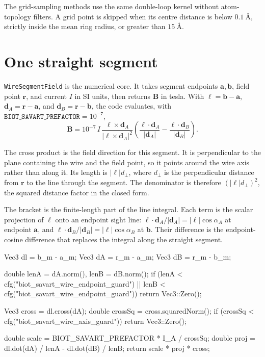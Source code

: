 \documentclass[11pt]{article}
\newcommand{\code}[1]{\texttt{#1}}
\begin{document}
The grid-sampling methods use the same double-loop kernel without atom-topology
filters. A grid point is skipped when its centre distance is below
\(\SI{0.1}{\angstrom}\), strictly inside the mean ring radius, or greater than
\(\SI{15}{\angstrom}\).

\section{One straight segment}

\code{WireSegmentField} is the numerical core. It takes segment endpoints
\(\bm a,\bm b\), field point \(\bm r\), and current \(I\) in SI units, then
returns \(\bm B\) in tesla. With
\(\bm\ell=\bm b-\bm a\), \(\bm d_A=\bm r-\bm a\), and
\(\bm d_B=\bm r-\bm b\), the code evaluates, with
\(\code{BIOT\_SAVART\_PREFACTOR}=10^{-7}\),
\[
  \bm B =
  10^{-7}\, I\,
  \frac{\bm\ell\times\bm d_A}{|\bm\ell\times\bm d_A|^2}
  \left(
    \frac{\bm\ell\cdot\bm d_A}{|\bm d_A|}
    -\frac{\bm\ell\cdot\bm d_B}{|\bm d_B|}
  \right).
\]

The cross product is the field direction for this segment. It is perpendicular
to the plane containing the wire and the field point, so it points around the
wire axis rather than along it. Its length is
\(|\bm\ell|d_\perp\), where \(d_\perp\) is the perpendicular distance from
\(\bm r\) to the line through the segment. The denominator is therefore
\((|\bm\ell|d_\perp)^2\), the squared distance factor in the closed form.

The bracket is the finite-length part of the line integral. Each term is the
scalar projection of \(\bm\ell\) onto an endpoint sight line:
\(\bm\ell\cdot\bm d_A/|\bm d_A|=|\bm\ell|\cos\alpha_A\) at endpoint
\(\bm a\), and \(\bm\ell\cdot\bm d_B/|\bm d_B|=|\bm\ell|\cos\alpha_B\) at
\(\bm b\). Their difference is the endpoint-cosine difference that replaces
the integral along the straight segment.

\begin{codebox}
Vec3 dl = b_m - a_m;
Vec3 dA = r_m - a_m;
Vec3 dB = r_m - b_m;

double lenA = dA.norm(), lenB = dB.norm();
if (lenA < cfg("biot_savart_wire_endpoint_guard") ||
    lenB < cfg("biot_savart_wire_endpoint_guard")) return Vec3::Zero();

Vec3 cross = dl.cross(dA);
double crossSq = cross.squaredNorm();
if (crossSq < cfg("biot_savart_wire_axis_guard")) return Vec3::Zero();

double scale = BIOT_SAVART_PREFACTOR * I_A / crossSq;
double proj = dl.dot(dA) / lenA - dl.dot(dB) / lenB;
return scale * proj * cross;
\end{codebox}
\end{document}
